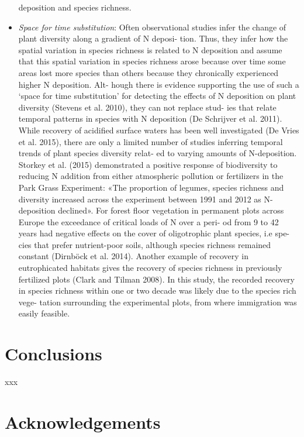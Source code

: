 \documentclass[fleqn,10pt,lineno]{wlpeerj} %
\theoremstyle{definition}
\theoremstyle{definition}
\theoremstyle{definition}
\theoremstyle{remark}
\begin{document}
\begin{itemize}
  deposition and species richness.
\item
  \emph{Space for time substitution}: Often observational studies infer
  the change of plant diversity along a gradient of N deposi- tion.
  Thus, they infer how the spatial variation in species richness is
  related to N deposition and assume that this spatial variation in
  species richness arose because over time some areas lost more species
  than others because they chronically experienced higher N deposition.
  Alt- hough there is evidence supporting the use of such a `space for
  time substitution' for detecting the effects of N deposition on plant
  diversity (Stevens et al. 2010), they can not replace stud- ies that
  relate temporal patterns in species with N deposition (De Schrijver et
  al. 2011). While recovery of acidified surface waters has been well
  investigated (De Vries et al. 2015), there are only a limited number
  of studies inferring temporal trends of plant species diversity relat-
  ed to varying amounts of N-deposition. Storkey et al. (2015)
  demonstrated a positive response of biodiversity to reducing N
  addition from either atmospheric pollution or fertilizers in the Park
  Grass Experiment: «The proportion of legumes, species richness and
  diversity increased across the experiment between 1991 and 2012 as
  N-deposition declined». For forest floor vegetation in permanent plots
  across Europe the exceedance of critical loads of N over a peri- od
  from 9 to 42 years had negative effects on the cover of oligotrophic
  plant species, i.e spe- cies that prefer nutrient-poor soils, although
  species richness remained constant (Dirnböck et al. 2014). Another
  example of recovery in eutrophicated habitats gives the recovery of
  species richness in previously fertilized plots (Clark and Tilman
  2008). In this study, the recorded recovery in species richness within
  one or two decade was likely due to the species rich vege- tation
  surrounding the experimental plots, from where immigration was easily
  feasible.
\end{itemize}

\section*{Conclusions}\label{conclusions}

xxx

\section*{Acknowledgements}\label{acknowledgements}
\end{document}
